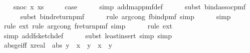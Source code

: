 \begin{isabellebody}
\isamarkupfalse%
\isanewline
\ \ \isamarkupfalse%
\ {\isacharparenleft}{\kern0pt}snoc\ x\ xs{\isacharparenright}{\kern0pt}\isanewline
\ \ \isamarkupfalse%
\ \isamarkupfalse%
\ {\isacharquery}{\kern0pt}case\isanewline
\ \ \ \ \isamarkupfalse%
\ {\isacharparenleft}{\kern0pt}simp\ add{\isacharcolon}{\kern0pt}map{\isacharunderscore}{\kern0pt}pmf{\isacharunderscore}{\kern0pt}def{\isacharparenright}{\kern0pt}\isanewline
\ \ \ \ \isamarkupfalse%
\ {\isacharparenleft}{\kern0pt}subst\ bind{\isacharunderscore}{\kern0pt}assoc{\isacharunderscore}{\kern0pt}pmf{\isacharparenright}{\kern0pt}\isanewline
\ \ \ \ \isamarkupfalse%
\ {\isacharparenleft}{\kern0pt}subst\ bind{\isacharunderscore}{\kern0pt}return{\isacharunderscore}{\kern0pt}pmf{\isacharparenright}{\kern0pt}\isanewline
\ \ \ \ \isamarkupfalse%
\ {\isacharparenleft}{\kern0pt}rule\ arg{\isacharunderscore}{\kern0pt}cong{}{\isacharbrackleft}{\kern0pt}\ f{\isacharequal}{\kern0pt}{\isachardoublequoteopen}bind{\isacharunderscore}{\kern0pt}pmf{\isachardoublequoteclose}{\isacharbrackright}{\kern0pt}{\isacharcomma}{\kern0pt}\ simp{\isacharparenright}{\kern0pt}\isanewline
\ \ \ \ \isamarkupfalse%
\ {\isacharparenleft}{\kern0pt}simp{\isacharparenright}{\kern0pt}\isanewline
\ \ \ \ \isamarkupfalse%
\ {\isacharparenleft}{\kern0pt}rule\ ext{\isacharcomma}{\kern0pt}\ rule\ arg{\isacharunderscore}{\kern0pt}cong{\isacharbrackleft}{\kern0pt}\ f{\isacharequal}{\kern0pt}{\isachardoublequoteopen}return{\isacharunderscore}{\kern0pt}pmf{\isachardoublequoteclose}{\isacharbrackright}{\kern0pt}{\isacharcomma}{\kern0pt}\ simp{\isacharparenright}{\kern0pt}\isanewline
\ \ \ \ \isamarkupfalse%
\ {\isacharparenleft}{\kern0pt}rule\ ext{\isacharparenright}{\kern0pt}\isanewline
\ \ \ \ \isamarkupfalse%
\ {\isacharparenleft}{\kern0pt}simp\ add{\isacharcolon}{\kern0pt}f{}{\isacharunderscore}{\kern0pt}sketch{\isacharunderscore}{\kern0pt}def{\isacharparenright}{\kern0pt}\isanewline
\ \ \ \ \isamarkupfalse%
\ {\isacharparenleft}{\kern0pt}subst\ least{\isacharunderscore}{\kern0pt}insert{\isacharcomma}{\kern0pt}\ simp{\isacharcomma}{\kern0pt}\ simp{\isacharparenright}{\kern0pt}\isanewline
{}\isamarkupfalse%
%
\endisatagproof
{\isafoldproof}%
%
\isadelimproof
\isanewline
%
\endisadelimproof
\isanewline
\isanewline
{}\isamarkupfalse%
\ abs{\isacharunderscore}{\kern0pt}ge{\isacharunderscore}{\kern0pt}iff{\isacharcolon}{\kern0pt}\ {\isachardoublequoteopen}{\isacharparenleft}{\kern0pt}{\isacharparenleft}{\kern0pt}x{\isacharcolon}{\kern0pt}{\isacharcolon}{\kern0pt}real{\isacharparenright}{\kern0pt}\ {\isasymle}\ abs\ y{\isacharparenright}{\kern0pt}\ {\isacharequal}{\kern0pt}\ {\isacharparenleft}{\kern0pt}x\ {\isasymle}\ y\ {\isasymor}\ x\ {\isasymle}\ {\isacharminus}{\kern0pt}y{\isacharparenright}{\kern0pt}{\isachardoublequoteclose}\isanewline

\end{isabellebody}
